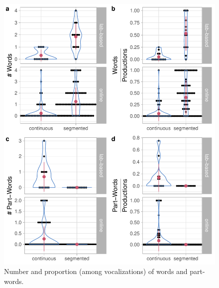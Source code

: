 \documentclass[
]{article}
\begin{document}
\begin{figure}

{\centering \includegraphics[width=0.8\linewidth]{segmentation_recall_combined_for_revision2_files/figure-latex/recall-words-part-words-raw-plot-1} 

}

\caption{Number and proportion (among vocalizations) of words and part-words.}\label{fig:recall-words-part-words-raw-plot}
\end{figure}
\end{document}
